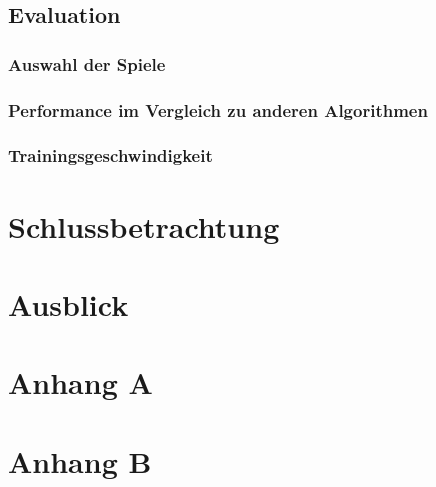 \documentclass[a4paper,titlepage]{article}
\numberwithin{equation}{section} %
\begin{document}
{\subsection{Evaluation}

\subsubsection{Auswahl der Spiele}

\subsubsection{Performance im Vergleich zu anderen Algorithmen}

\subsubsection{Trainingsgeschwindigkeit}

\newpage



\section{Schlussbetrachtung}
\newpage


\section{Ausblick}
\newpage



\begingroup
{}
\renewcommand*\refname{Literaturverzeichnis}
\printbibliography

\endgroup

\newpage
\section*{Anhang A}
\setcounter{page}{1}



\newpage


\section*{Anhang B}

\newpage

\end{document}
